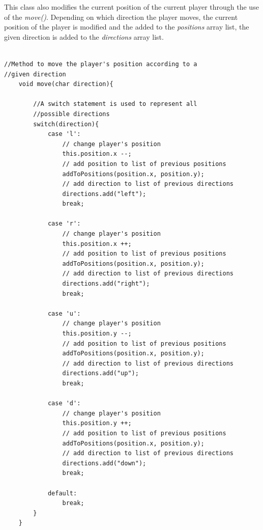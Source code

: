 \documentclass[a4paper,12pt]{extarticle}
\begin{document}
\newpage
\noindent This class also modifies the current position of the current player through the use of the \textit{move()}. Depending on which direction the player moves, the current position of the player is modified and the added to the \textit{positions} array list, the given direction is added to the \textit{directions} array list.

\begin{lstlisting}

//Method to move the player's position according to a 
//given direction
    void move(char direction){

        //A switch statement is used to represent all 
        //possible directions
        switch(direction){
            case 'l':
                // change player's position
                this.position.x --;
                // add position to list of previous positions
                addToPositions(position.x, position.y);
                // add direction to list of previous directions
                directions.add("left");
                break;

            case 'r':
                // change player's position
                this.position.x ++;
                // add position to list of previous positions
                addToPositions(position.x, position.y);
                // add direction to list of previous directions
                directions.add("right");
                break;

            case 'u':
                // change player's position
                this.position.y --;
                // add position to list of previous positions
                addToPositions(position.x, position.y);
                // add direction to list of previous directions
                directions.add("up");
                break;

            case 'd':
                // change player's position
                this.position.y ++;
                // add position to list of previous positions
                addToPositions(position.x, position.y);
                // add direction to list of previous directions
                directions.add("down");
                break;

            default:
                break;
        }
    }

\end{lstlisting}
\vspace{4mm}

\newpage
\end{document}
